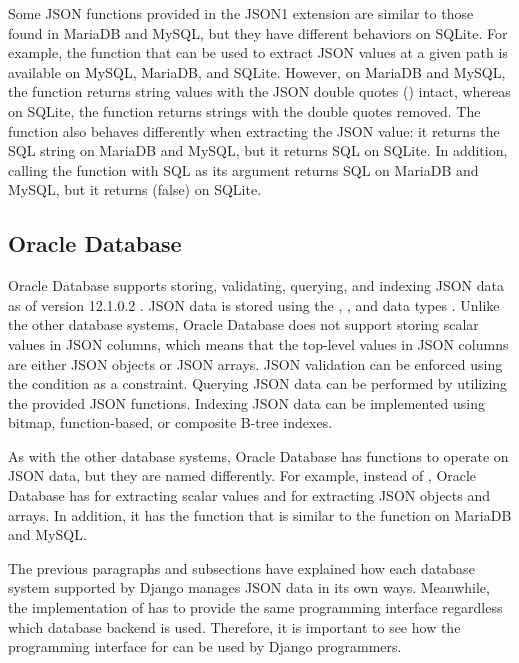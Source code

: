 Some JSON functions provided in the JSON1 extension are similar to those found
in MariaDB and MySQL, but they have different behaviors on SQLite. For example,
the  function that can be used to extract JSON values at a
given path is available on MySQL, MariaDB, and SQLite. However, on MariaDB and
MySQL, the function returns string values with the JSON double quotes
() intact, whereas on SQLite, the function returns strings with the
double quotes removed. The function also behaves differently when extracting
the JSON  value: it returns the SQL string  on
\mbox{MariaDB} and MySQL, but it returns SQL  on SQLite. In
addition, calling the  function with SQL  as its
argument returns SQL  on MariaDB and MySQL, but it returns 
(false) on SQLite.

\subsection{Oracle Database}

Oracle Database supports storing, validating, querying, and indexing JSON data
as of version 12.1.0.2 \cite{oracle:12.1.0.2}. JSON data is stored using the
, , and  data types \cite{oracle:json}.
Unlike the other database systems, Oracle Database does not support storing
scalar values in JSON columns, which means that the top-level values in JSON
columns are either JSON objects or JSON arrays. JSON validation can be enforced
using the  condition as a  constraint. Querying JSON
data can be performed by utilizing the provided JSON functions. Indexing JSON
data can be implemented using bitmap, function-based, or composite B-tree
indexes.

As with the other database systems, Oracle Database has functions to operate on
JSON data, but they are named differently. For example, instead of
, Oracle Database has  for extracting
scalar values and  for extracting JSON objects and arrays. In
addition, it has the  function that is similar to the
 function on MariaDB and MySQL.

The previous paragraphs and subsections have explained how each database
system supported by Django manages JSON data in its own ways. Meanwhile, the
implementation of  has to provide the same programming
interface regardless which database backend is used. Therefore, it is important
to see how the programming interface for  can be used by Django
programmers.


